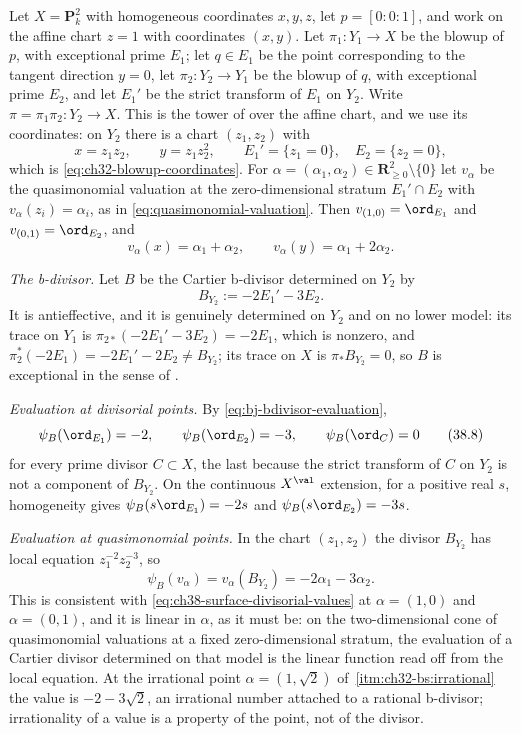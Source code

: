 \begin{example}
\label{ex:ch38-blowup-surface-evaluation}
Let $X=\mathbf P^2_k$ with homogeneous coordinates $x,y,z$, let
$p=[0:0:1]$, and work on the affine chart $z=1$ with coordinates
$(x,y)$.  Let $\pi_1:Y_1\to X$ be the blowup of $p$, with
exceptional prime $E_1$; let $q\in E_1$ be the point corresponding to
the tangent direction $y=0$, let $\pi_2:Y_2\to Y_1$ be the blowup of
$q$, with exceptional prime $E_2$, and let $E_1'$ be the strict
transform of $E_1$ on $Y_2$.  Write $\pi=\pi_1\pi_2:Y_2\to X$.  This
is the tower of  over the affine chart, and
we use its coordinates: on $Y_2$ there is a chart $(z_1,z_2)$ with
\[
 x=z_1z_2,\qquad y=z_1z_2^2,
 \qquad
 E_1'=\{z_1=0\},\quad E_2=\{z_2=0\},
\]
which is \eqref{eq:ch32-blowup-coordinates}.  For
$\alpha=(\alpha_1,\alpha_2)\in\mathbf R^2_{\geq0}\setminus\{0\}$ let
$v_\alpha$ be the quasimonomial valuation at the zero-dimensional
stratum $E_1'\cap E_2$ with $v_\alpha(z_i)=\alpha_i$, as in
\eqref{eq:quasimonomial-valuation}.  Then
$v_{(1,0)}=\ord_{E_1}$ and $v_{(0,1)}=\ord_{E_2}$, and
\[
 v_\alpha(x)=\alpha_1+\alpha_2,
 \qquad
 v_\alpha(y)=\alpha_1+2\alpha_2 .
\tag{38.6}\label{eq:ch38-surface-coordinates}
\]

\emph{The b-divisor.}  Let $B$ be the Cartier b-divisor determined on
$Y_2$ by
\[
 B_{Y_2}:=-2E_1'-3E_2 .
\tag{38.7}\label{eq:ch38-surface-bdivisor}
\]
It is antieffective, and it is genuinely determined on $Y_2$ and on no
lower model: its trace on $Y_1$ is
$\pi_{2*}(-2E_1'-3E_2)=-2E_1$, which is nonzero, and
$\pi_2^*(-2E_1)=-2E_1'-2E_2\neq B_{Y_2}$; its trace on $X$ is
$\pi_*B_{Y_2}=0$, so $B$ is exceptional in the sense of
.

\emph{Evaluation at divisorial points.}  By
\eqref{eq:bj-bdivisor-evaluation},
\[
 \psi_B(\ord_{E_1})=-2,
 \qquad
 \psi_B(\ord_{E_2})=-3,
 \qquad
 \psi_B(\ord_C)=0
\tag{38.8}\label{eq:ch38-surface-divisorial-values}
\]
for every prime divisor $C\subset X$, the last because the strict
transform of $C$ on $Y_2$ is not a component of $B_{Y_2}$.  On the continuous $X^{\val}$ extension, for a
positive real $s$, homogeneity gives
$\psi_B(s\ord_{E_1})=-2s$ and $\psi_B(s\ord_{E_2})=-3s$.

\emph{Evaluation at quasimonomial points.}  In the chart $(z_1,z_2)$ the
divisor $B_{Y_2}$ has local equation $z_1^{-2}z_2^{-3}$, so
\[
 \psi_B(v_\alpha)=v_\alpha(B_{Y_2})=-2\alpha_1-3\alpha_2 .
\tag{38.9}\label{eq:ch38-surface-quasimonomial-value}
\]
This is consistent with \eqref{eq:ch38-surface-divisorial-values} at
$\alpha=(1,0)$ and $\alpha=(0,1)$, and it is linear in $\alpha$,
as it must be: on the two-dimensional cone of quasimonomial valuations at
a fixed zero-dimensional stratum, the evaluation of a Cartier divisor
determined on that model is the linear function read off from the local
equation.  At the irrational point
$\alpha=(1,\sqrt2)$ of
\,\cref{itm:ch32-bs:irrational} the value is
$-2-3\sqrt2$, an irrational number attached to a rational b-divisor;
irrationality of a value is a property of the point, not of the divisor.


\end{example}
